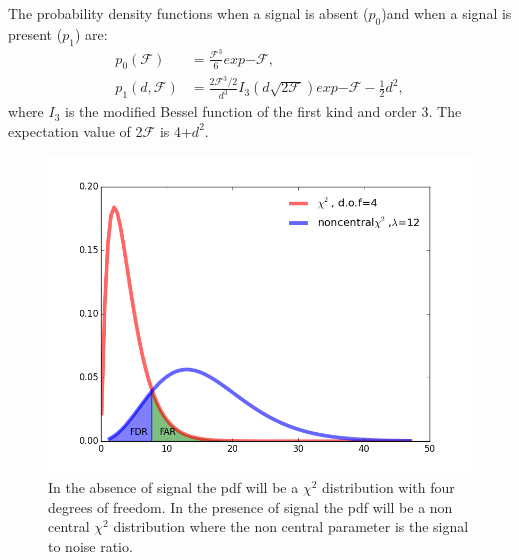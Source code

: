 \documentclass{ttuthes2007}
\begin{document}
The probability density functions when a signal is absent ($p_0$)and when a signal is
present ($p_1$) are:
\begin{equation}
\begin{split}
p_0(\mathcal{F})&=\frac{\mathcal{F}^3}{6}exp{-\mathcal{F}},\\
p_1(d,\mathcal{F})&=\frac{2\mathcal{F}^3/2}{d^3}I_3(d\sqrt{2\mathcal{F}})exp{-\mathcal{F}-\frac{1}{2}d^2},
\end{split}
\end{equation}
where $I_3$ is the modified Bessel function of the first kind and order 3.
The expectation value of 2$\mathcal{F}$ is 4+$d^2$.
\begin{figure}[h!]
	\includegraphics[width=\textwidth]{figure/chi2.png}
	\caption{In the absence of signal the pdf will be a $\chi^2$ distribution with
four degrees of freedom. In the presence of signal the pdf will be a non central
$\chi^2$ distribution where the non central parameter is the signal to noise
ratio.}
\end{figure}
\end{document}

